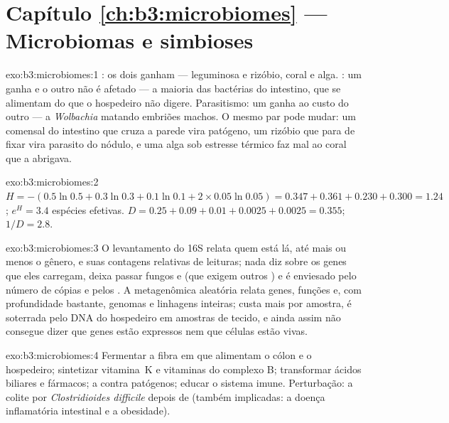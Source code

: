 \section*{Capítulo \ref{ch:b3:microbiomes} --- Microbiomas e simbioses}

\begin{solution}{exo:b3:microbiomes:1}
: os dois ganham --- leguminosa e rizóbio, coral e alga.
: um ganha e o outro não é afetado --- a maioria das
bactérias do intestino, que se alimentam do que o hospedeiro não
digere. Parasitismo: um ganha ao custo do outro --- a \emph{Wolbachia}
matando embriões machos. O mesmo par pode mudar: um comensal do
intestino que cruza a parede vira patógeno, um rizóbio que para de
fixar vira parasito do nódulo, e uma alga sob estresse térmico faz mal
ao coral que a abrigava.
\end{solution}

\begin{solution}{exo:b3:microbiomes:2}
$H = -(0.5\ln 0.5 + 0.3\ln 0.3 + 0.1\ln 0.1 + 2\times 0.05\ln 0.05) =
0.347 + 0.361 + 0.230 + 0.300 = 1.24$; $e^{H} = 3.4$ espécies
efetivas. $D = 0.25 + 0.09 + 0.01 + 0.0025 + 0.0025 = 0.355$; $1/D =
2.8$.
\end{solution}

\begin{solution}{exo:b3:microbiomes:3}
O levantamento do 16S relata quem está lá, até mais ou menos o gênero, e
suas contagens relativas de leituras; nada diz sobre os genes que eles
carregam, deixa passar fungos e  (que exigem outros ) e
é enviesado pelo número de cópias e pelos . A metagenômica
aleatória relata genes, funções e, com profundidade bastante, genomas
e linhagens inteiras; custa mais por amostra, é soterrada pelo DNA do
hospedeiro em amostras de tecido, e ainda assim não consegue dizer que
genes estão expressos nem que células estão vivas.
\end{solution}

\begin{solution}{exo:b3:microbiomes:4}
Fermentar a fibra em  que alimentam o
cólon e o hospedeiro; sintetizar vitamina~K e vitaminas do complexo B;
transformar ácidos biliares e fármacos; a 
contra patógenos; educar o sistema imune. Perturbação: a colite por
\emph{Clostridioides difficile} depois de  (também
implicadas: a doença inflamatória intestinal e a obesidade).
\end{solution}

